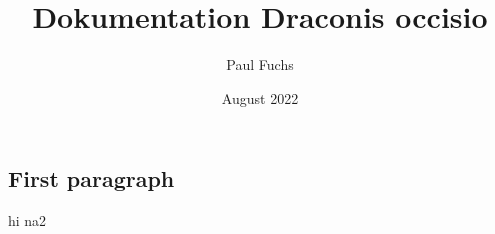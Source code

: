 \documentclass[12pt, ngerman]{article}
\title{Dokumentation Draconis occisio}
\author{Paul Fuchs}
\date{August 2022}
\begin{document}
\maketitle

\begin{spacing}{1.15}
\section{First paragraph}
hi \newline
na2
\end{spacing}
\end{document}
